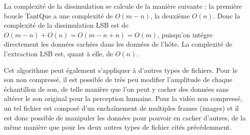 \documentclass[11pt]{article}
\begin{document}






La complexité de la dissimulation se calcule de la manière suivante : 
la première boucle TantQue a une complexité de $O(m-n)$, la deuxième $O(n)$. 
\newline Donc la complexité de la dissimulation LSB est de $O(m-n)+O(n)=O(m-n+n)=O(m)$, 
puisqu'on intégre directement les données cachées dans les données de l'hôte. 
\newline La complexité de l'extraction LSB est, quant à elle, de $O(n)$.

Cet algorithme peut également s'appliquer à d'autres types de fichiers. Pour le
son non compressé, il est possible de très peu modifier l'amplitude de chaque
échantillon de son, de telle manière que l'on peut y cacher des données sans
altérer le son original pour la perception humaine. Pour la vidéo non compressé,
un tel fichier est composé d'un enchaînement de multiples frames (images) et il
est donc possible de manipuler les données pour pouvoir en cacher d'autres, de
la même manière que pour les deux autres types de fichier cités précédemment.
\end{document}
